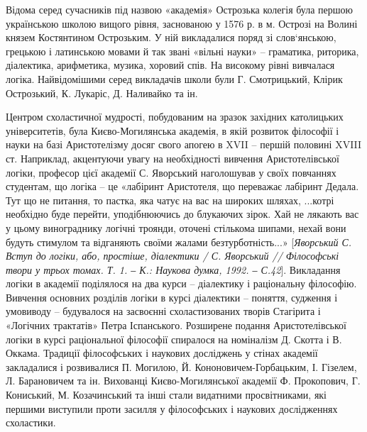 Відома серед сучасників під назвою «академія» Острозька колегія була
першою українською школою вищого рівня, заснованою у 1576 р. в м. Острозі
на Волині князем Костянтином Острозьким. У ній викладалися поряд зі
слов`янською, грецькою і латинською мовами й так звані «вільні науки» –
граматика, риторика, діалектика, арифметика, музика, хоровий спів. На
високому рівні вивчалася логіка. Найвідомішими серед викладачів школи були
Г. Смотрицький, Клірик Острозький, К. Лукаріс, Д. Наливайко та ін.

Центром схоластичної мудрості, побудованим на зразок західних
католицьких університетів, була Києво-Могилянська академія, в якій розвиток
філософії і науки на базі Аристотелізму досяг свого апогею в XVII – першій
половині XVIII ст. Наприклад, акцентуючи увагу на необхідності вивчення
Аристотелівської логіки, професор цієї академії С. Яворський наголошував у
своїх повчаннях студентам, що логіка – це «лабіринт Аристотеля, що переважає
лабіринт Дедала. Тут що не питання, то пастка, яка чатує на вас на широких
шляхах, ...котрі необхідно буде перейти, уподібнюючись до блукаючих зірок.
Хай не лякають вас у цьому винограднику логічні троянди, оточені стількома
шипами, нехай вони будуть стимулом та відганяють своїми жалами
безтурботність...» [\textit{Яворський С. Вступ до логіки, або, простіше, діалектики /
С. Яворський // Філософські твори у трьох томах. Т. 1. ‒ К.: Наукова думка,
1992. ‒ С.42}]. Викладання логіки в академії поділялося на два курси –
діалектику і раціональну філософію. Вивчення основних розділів логіки в курсі
діалектики – поняття, судження і умовиводу – будувалося на засвоєнні
схоластизованих творів Стагірита і «Логічних трактатів» Петра Іспанського.
Розширене подання Аристотелівської логіки в курсі раціональної філософії
спиралося на номіналізм Д. Скотта і В. Оккама. Традиції філософських і
наукових досліджень у стінах академії закладалися і розвивалися П. Могилою,
Й. Кононовичем-Горбацьким, І. Гізелем, Л. Барановичем та ін. Вихованці
Києво-Могилянської академії Ф. Прокопович, Г. Кониський, М. Козачинський
та інші стали видатними просвітниками, які першими виступили проти засилля
у філософських і наукових дослідженнях схоластики.

